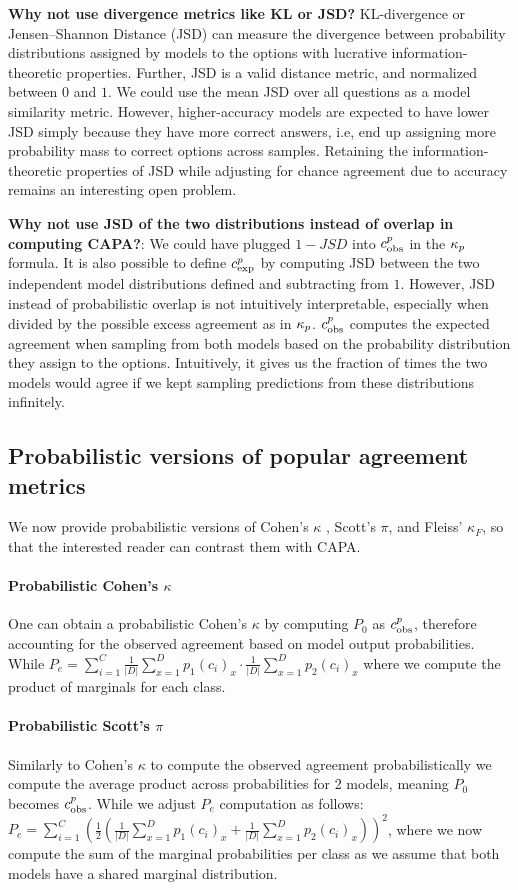 \textbf{Why not use divergence metrics like KL or JSD?} KL-divergence or Jensen–Shannon Distance (JSD) can measure the divergence between probability distributions assigned by models to the options with lucrative information-theoretic properties. Further, JSD is a valid distance metric, and normalized between $0$ and $1$. We could use the mean JSD over all questions as a model similarity metric. However, higher-accuracy models are expected to have lower JSD simply because they have more correct answers, i.e, end up assigning more probability mass to correct options across samples. Retaining the information-theoretic properties of JSD while adjusting for chance agreement due to accuracy remains an interesting open problem.


\textbf{Why not use JSD of the two distributions instead of overlap in computing CAPA?}: We could have plugged $1 - JSD$ into $c_{\text{obs}}^{p}$ in the $\kappa_{p}$ formula. It is also possible to define $c_{\text{exp}}^{p}$ by computing JSD between the two independent model distributions defined and subtracting from $1$. However, JSD instead of probabilistic overlap is not intuitively interpretable, especially when divided by the possible excess agreement as in $\kappa_{p}$. $c_{\text{obs}}^{p}$ computes the expected agreement when sampling from both models based on the probability distribution they assign to the options. Intuitively, it gives us the fraction of times the two models would agree if we kept sampling predictions from these distributions infinitely.


\subsection{Probabilistic versions of popular agreement metrics}
\label{sec:probabilistic_metrics}
We now provide probabilistic versions of Cohen's $\kappa$ , Scott's $\pi$, and Fleiss' $\kappa_F$, so that the interested reader can contrast them with CAPA.

\paragraph{Probabilistic Cohen's $\kappa$} One can obtain a probabilistic Cohen's $\kappa$ by computing $P_0$ as $c_{\text{obs}}^{p}$, therefore accounting for the observed agreement based on model output probabilities. While $P_e = \sum_{i=1}^C \frac{1}{|D|}\sum_{x=1}^{D}p_1(c_i)_x \cdot \frac{1}{|D|}\sum_{x=1}^{D}p_2(c_i)_x$ where we compute the product of marginals for each class. 

\paragraph{Probabilistic Scott's $\pi$} Similarly to Cohen's $\kappa$ to compute the observed agreement probabilistically we compute the average product across probabilities for 2 models, meaning $P_0$ becomes $c_{\text{obs}}^{p}$. While we adjust $P_e$ computation as follows: $P_e = \sum_{i=1}^{C}(\frac{1}{2}(\frac{1}{|D|}\sum_{x=1}^{D}p_1(c_i)_x+\frac{1}{|D|}\sum_{x=1}^{D}p_2(c_i)_x))^2$, where we now compute the sum of the marginal probabilities per class as we assume that both models have a shared marginal distribution.

